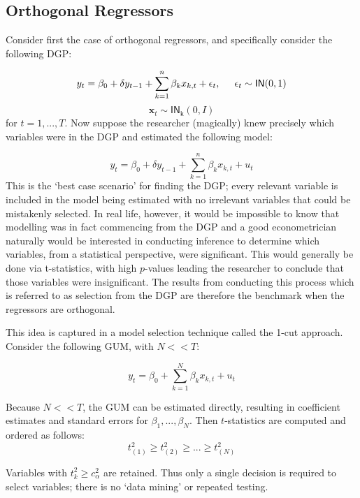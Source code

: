 \subsection{Orthogonal Regressors}

Consider first the case of orthogonal regressors, and specifically consider the following DGP:

$$y_{t}=\beta_{0} + \delta y_{t-1}+\sum_{k=1}^{n}\beta_{k}x_{k,t} + \epsilon_{t}, \hspace{.5cm} \epsilon_{t} \sim \mathsf{IN}(0, 1) $$
$$\mathbf{x}_{t} \sim \mathsf{IN_{k}}(0, I) $$
for $t=1,...,T$. Now suppose the researcher (magically) knew precisely which variables were in the DGP and estimated the following model:

$$y_{t}=\beta_{0} + \delta y_{t-1}+\sum_{k=1}^{n}\beta_{k}x_{k,t} + u_{t} $$
This is the `best case scenario' for finding the DGP; every relevant variable is included in the model being estimated with no irrelevant variables that could be mistakenly selected. In real life, however, it would be impossible to know that modelling was in fact commencing from the DGP and a good econometrician naturally would be interested in conducting inference to determine which variables, from a statistical perspective, were significant. This would generally be done via t-statistics, with high $p$-values leading the researcher to conclude that those variables were insignificant. The results from conducting this process which is referred to as selection from the DGP are therefore the benchmark when the regressors are orthogonal. 

This idea is captured in a model selection technique called the 1-cut approach. Consider the following GUM, with $N<<T$:

$$y_{t} = \beta_{0} + \sum_{k=1}^{N}\beta_{k}x_{k,t} + u_{t}$$

Because $N<<T$, the GUM can be estimated directly, resulting in coefficient estimates and standard errors for $\beta_{1},...,\beta_{N}$. Then $t$-statistics are computed and ordered as follows: 
$$t_{(1)}^{2} \geq t_{(2)}^{2} \geq ... \geq  t_{(N)}^{2}$$

Variables with $t_{k}^{2} \geq c_{\alpha}^{2}$ are retained. Thus only a single decision is required to select variables; there is no `data mining' or repeated testing. 

